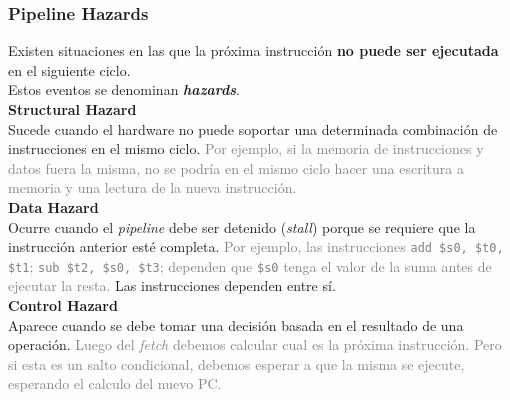 \documentclass[aspectratio=169]{beamer}
\begin{document}
\begin{frame}[t,fragile]
    \frametitle{Pipeline Hazards}
    \small
    Existen situaciones en las que la próxima instrucción \textbf{no puede ser ejecutada} en el siguiente ciclo.\\
    \textcolor{verdeuca}{Estos eventos se denominan \textbf{\emph{hazards}}.}\\
    \bigskip
    \pause
    \textcolor{naranjauca}{\textbf{Structural Hazard}}\\
    \vspace{0.2cm}
    Sucede cuando el hardware no puede soportar una determinada combinación de instrucciones en el mismo ciclo.
    \textcolor{gray}{Por ejemplo, si la memoria de instrucciones y datos fuera la misma, no se podría en el mismo ciclo hacer una escritura a memoria y una lectura de la nueva instrucción.}\\
    \vspace{0.2cm}
    \pause
    \textcolor{naranjauca}{\textbf{Data Hazard}}\\
    \vspace{0.2cm}
    Ocurre cuando el \emph{pipeline} debe ser detenido (\emph{stall}) porque se requiere que la instrucción anterior esté completa.
    \textcolor{gray}{Por ejemplo, las instrucciones \texttt{add \$s0, \$t0, \$t1}; \texttt{sub \$t2, \$s0, \$t3}; dependen que \texttt{\$s0} tenga el valor de la suma antes de ejecutar la resta.}
    Las instrucciones dependen entre sí.\\
    \vspace{0.2cm}
    \pause
    \textcolor{naranjauca}{\textbf{Control Hazard}}\\
    \vspace{0.2cm}
    Aparece cuando se debe tomar una decisión basada en el resultado de una operación.
    \textcolor{gray}{Luego del \emph{fetch} debemos calcular cual es la próxima instrucción. Pero si esta es un salto condicional, debemos esperar a que la misma se ejecute, esperando el calculo del nuevo PC.}
\end{frame}
\end{document}
